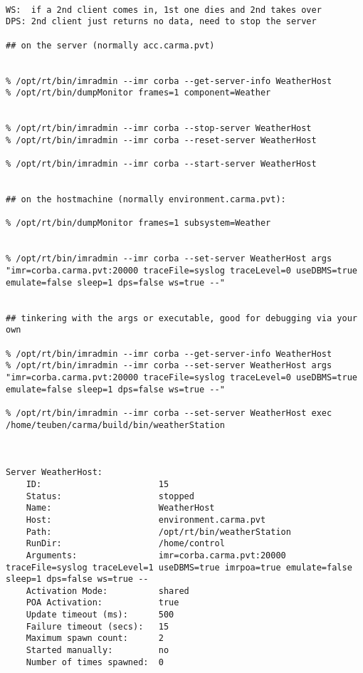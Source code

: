 \documentclass[11pt]{article}
\begin{document}
\footnotesize
\begin{verbatim}

WS:  if a 2nd client comes in, 1st one dies and 2nd takes over
DPS: 2nd client just returns no data, need to stop the server

## on the server (normally acc.carma.pvt)


% /opt/rt/bin/imradmin --imr corba --get-server-info WeatherHost
% /opt/rt/bin/dumpMonitor frames=1 component=Weather


% /opt/rt/bin/imradmin --imr corba --stop-server WeatherHost
% /opt/rt/bin/imradmin --imr corba --reset-server WeatherHost

% /opt/rt/bin/imradmin --imr corba --start-server WeatherHost


## on the hostmachine (normally environment.carma.pvt):

% /opt/rt/bin/dumpMonitor frames=1 subsystem=Weather


% /opt/rt/bin/imradmin --imr corba --set-server WeatherHost args "imr=corba.carma.pvt:20000 traceFile=syslog traceLevel=0 useDBMS=true emulate=false sleep=1 dps=false ws=true --"


## tinkering with the args or executable, good for debugging via your own 

% /opt/rt/bin/imradmin --imr corba --get-server-info WeatherHost
% /opt/rt/bin/imradmin --imr corba --set-server WeatherHost args "imr=corba.carma.pvt:20000 traceFile=syslog traceLevel=0 useDBMS=true emulate=false sleep=1 dps=false ws=true --"

% /opt/rt/bin/imradmin --imr corba --set-server WeatherHost exec /home/teuben/carma/build/bin/weatherStation



Server WeatherHost:
    ID:                       15
    Status:                   stopped
    Name:                     WeatherHost
    Host:                     environment.carma.pvt
    Path:                     /opt/rt/bin/weatherStation
    RunDir:                   /home/control
    Arguments:                imr=corba.carma.pvt:20000 traceFile=syslog traceLevel=1 useDBMS=true imrpoa=true emulate=false sleep=1 dps=false ws=true --
    Activation Mode:          shared
    POA Activation:           true
    Update timeout (ms):      500
    Failure timeout (secs):   15
    Maximum spawn count:      2
    Started manually:         no
    Number of times spawned:  0

\end{verbatim}
\footnotesize
\end{document}
